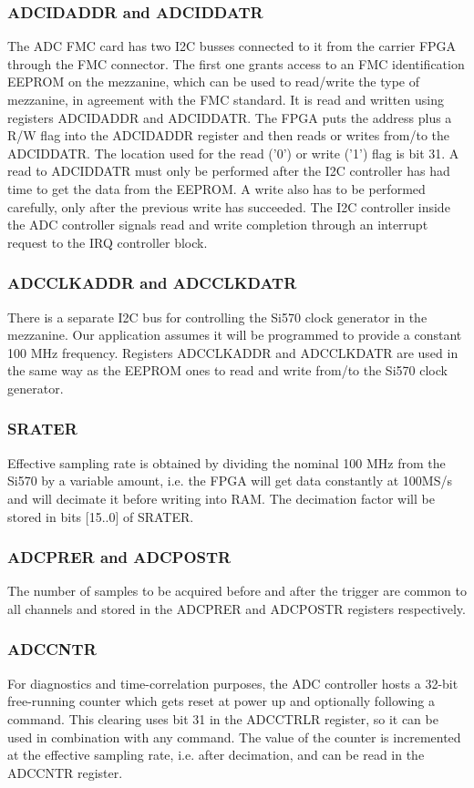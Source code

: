\documentclass{article}
\begin{document}
\subsubsection{ADCIDADDR and ADCIDDATR}
The ADC FMC card has two I2C busses connected to it from the carrier FPGA through the FMC connector. The first one grants access to an FMC identification EEPROM on the mezzanine, which can be used to read/write the type of mezzanine, in agreement with the FMC standard. It is read and written using registers ADCIDADDR and ADCIDDATR. The FPGA puts the address plus a R/W flag into the ADCIDADDR register and then reads or writes from/to the ADCIDDATR. The location used for the read ('0') or write ('1') flag is bit 31. A read to ADCIDDATR must only be performed after the I2C controller has had time to get the data from the EEPROM. A write also has to be performed carefully, only after the previous write has succeeded. The I2C controller inside the ADC controller signals read and write completion through an interrupt request to the IRQ controller block. 

\subsubsection{ADCCLKADDR and ADCCLKDATR}
There is a separate I2C bus for controlling the Si570 clock generator in the mezzanine. Our application assumes it will be programmed to provide a constant 100 MHz frequency. Registers ADCCLKADDR and ADCCLKDATR are used in the same way as the EEPROM ones to read and write from/to the Si570 clock generator. 

\subsubsection{SRATER}
Effective sampling rate is obtained by dividing the nominal 100 MHz from the Si570 by a variable amount, i.e. the FPGA will get data constantly at 100MS/s and will decimate it before writing into RAM. The decimation factor will be stored in bits [15..0] of SRATER.

\subsubsection{ADCPRER and ADCPOSTR}
The number of samples to be acquired before and after the trigger are common to all channels and stored in the ADCPRER and ADCPOSTR registers respectively.

\subsubsection{ADCCNTR}
For diagnostics and time-correlation purposes, the ADC controller hosts a 32-bit free-running counter which gets reset at power up and optionally following a command. This clearing uses bit 31 in the ADCCTRLR register, so it can be used in combination with any command. The value of the counter is incremented at the effective sampling rate, i.e. after decimation, and can be read in the ADCCNTR register.   
\end{document}
